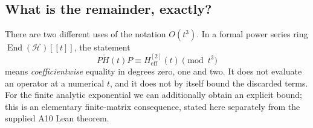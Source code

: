 \subsection{What is the remainder, exactly?}
\label{subsec:ch21-sw-remainder}

There are two different uses of the notation $O(t^3)$.  In a formal
power series ring $\operatorname{End}(\mathcal H)[[t]]$, the statement
\begin{equation}
P\widetilde H(t)P\equiv H_{\mathrm{eff}}^{[2]}(t)
 \pmod{t^3}
\label{eq:ch21-sw-formal-mod}
\end{equation}
means \emph{coefficientwise} equality in degrees zero, one and two.
It does not evaluate an operator at a numerical $t$, and it does not
by itself bound the discarded terms.  For the finite analytic
exponential we can additionally obtain an explicit bound; this is
an elementary finite-matrix consequence, stated here separately from
the supplied A10 Lean theorem.

